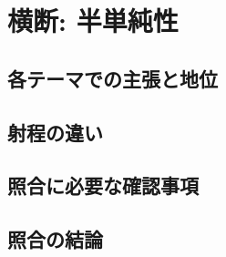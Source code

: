 
\section{横断: 半単純性}

\subsection{各テーマでの主張と地位}

\subsection{射程の違い}

\subsection{照合に必要な確認事項}

\subsection{照合の結論}
